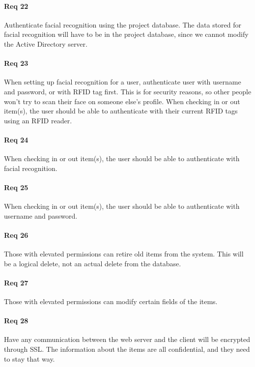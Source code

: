 \documentclass[10pt, onecolumn, twoside, peerreview]{IEEEtran}
\begin{document}
\paragraph*{Req 22} Authenticate facial recognition using the project database. The data stored for facial recognition will have to be in
the project database, since we cannot modify the Active Directory server.\\

\paragraph*{Req 23} When setting up facial recognition for a user, authenticate user with username and password, or with RFID tag first.
This is for security reasons, so other people won't try to scan their face on someone else's profile. When checking in
or out item(s), the user should be able to authenticate with their current RFID tags using an RFID reader.\\

\paragraph*{Req 24} When checking in or out item(s), the user should be able to authenticate with facial recognition.\\

\paragraph*{Req 25} When checking in or out item(s), the user should be able to authenticate with username and password.\\

\paragraph*{Req 26} Those with elevated permissions can retire old items from the system. This will be a logical delete, not an actual
delete from the database.\\

\paragraph*{Req 27} Those with elevated permissions can modify certain fields of the items.\\

\paragraph*{Req 28} Have any communication between the web server and the client will be encrypted through SSL. The information about the
items are all confidential, and they need to stay that way.\\
\end{document}
